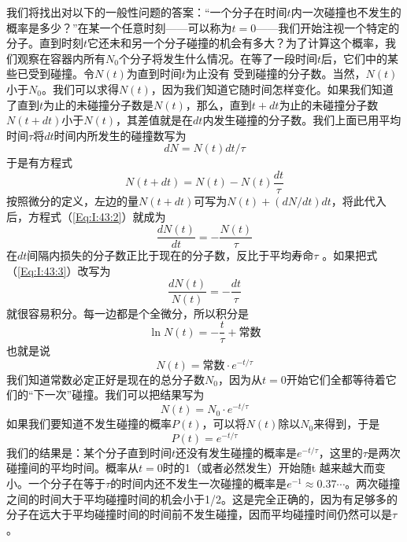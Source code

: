 我们将找出对以下的一般性问题的答案：“一个分子在时间$t$内一次碰撞也不发生的概率是多少？”在某一个任意时刻——可以称为$t =0$——我们开始注视一个特定的分子。直到时刻$t$它还未和另一个分子碰撞的机会有多大？为了计算这个概率，我们观察在容器内所有$N_0$个分子将发生什么情况。在等了一段时间$t$后，它们中的某些已受到碰撞。令$N(t)$为直到时间$t$为止没有 受到碰撞的分子数。当然，$N (t)$小于$N_0$。我们可以求得$N(t)$，因为我们知道它随时间怎样变化。如果我们知道了直到$t$为止的未碰撞分子数是$N(t)$，那么，直到$t+dt$为止的未碰撞分子数$N(t +dt)$小于$N(t)$，其差值就是在$dt$内发生碰撞的分子数。我们上面已用平均时间$\tau$将$dt$时间内所发生的碰撞数写为
\begin{equation*}
    dN=N(t)dt/\tau
\end{equation*}
于是有方程式
\begin{equation}
    \label{Eq:I:43:2}
    N(t+dt)=N(t)-N(t)\frac{dt}{\tau}
\end{equation}
按照微分的定义，左边的量$N(t+dt)$可写为$N(t)+(dN/dt)dt$，将此代入后，方程式（\ref{Eq:I:43:2}）就成为
\begin{equation}
    \label{Eq:I:43:3}
    \frac{dN(t)}{dt}=-\frac{N(t)}{\tau}
\end{equation}
在$dt$间隔内损失的分子数正比于现在的分子数，反比于平均寿命$\tau$ 。如果把式（\ref{Eq:I:43:3}）改写为
\begin{equation}
    \label{Eq:I:43:4}
    \frac{dN(t)}{N(t)}=-\frac{dt}{\tau}
\end{equation}
就很容易积分。每一边都是个全微分，所以积分是
\begin{equation}
    \label{Eq:I:43:5}
    \ln N(t) = -\frac{t}{\tau} + \text{常数}
\end{equation}
也就是说
\begin{equation}
    \label{Eq:I:43:6}
    N(t)=\text{常数}\cdot e^{- t/\tau}
\end{equation}
我们知道常数必定正好是现在的总分子数$N_0$，因为从$t =0$开始它们全都等待着它们的“下一次”碰撞。我们可以把结果写为
\begin{equation}
    \label{Eq:I:43:7}
    N(t)=N_0\cdot e^{- t/\tau}
\end{equation}
如果我们要知道不发生碰撞的概率$P(t)$，可以将$N(t)$除以$N_0$来得到，于是
\begin{equation}
    \label{Eq:I:43:8}
    P(t)=e^{-t/\tau}
\end{equation}
我们的结果是：某个分子直到时间$t$还没有发生碰撞的概率是$e^{-t/\tau}$，这里的$\tau$是两次碰撞间的平均时间。概率从$t =0$时的1（或者必然发生）开始随t 越来越大而变小。一个分子在等于$\tau$的时间内还不发生一次碰撞的概率是$e^{-1} \approx 0.37\cdots $。两次碰撞之间的时间大于平均碰撞时间的机会小于1/2。这是完全正确的，因为有足够多的分子在远大于平均碰撞时间的时间前不发生碰撞，因而平均碰撞时间仍然可以是$\tau$。

